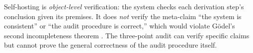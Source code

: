 \begin{remark}
Self-hosting is \emph{object-level} verification: the system checks each
derivation step's conclusion given its premises.  It does \emph{not}
verify the meta-claim ``the system is consistent'' or ``the audit
procedure is correct,'' which would violate G\"{o}del's second
incompleteness theorem \citep{godel1931}.  The three-point audit can
verify specific claims but cannot prove the general correctness of the
audit procedure itself.
\end{remark}
